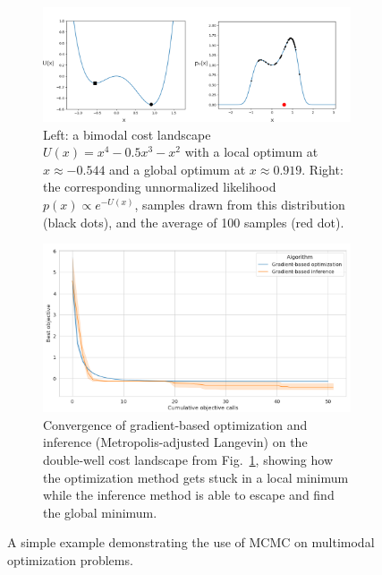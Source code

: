 \begin{figure}[tb]
    \centering
    \begin{subfigure}[b]{\linewidth}
        \centering
        \includegraphics[width=0.7\linewidth]{images/global_methods/sampling_as_optimization.png}
        \caption{Left: a bimodal cost landscape $U(x) = x^4 - 0.5 x^3 - x^2$ with a local optimum at $x\approx -0.544$ and a global optimum at $x\approx 0.919$. Right: the corresponding unnormalized likelihood $p(x) \propto e^{-U(x)}$, samples drawn from this distribution (black dots), and the average of 100 samples (red dot).}
        \label{ch:corl:fig:toy_example}
    \end{subfigure}
    \begin{subfigure}[b]{\linewidth}
        \centering
        \includegraphics[width=0.7\linewidth]{images/global_methods/double_well_gd_mala.png}
        \caption{Convergence of gradient-based optimization and inference (Metropolis-adjusted Langevin) on the double-well cost landscape from Fig.~\ref{ch:corl:fig:toy_example}, showing how the optimization method gets stuck in a local minimum while the inference method is able to escape and find the global minimum.}
        \label{ch:corl:fig:toy_example_convergence}
    \end{subfigure}
    \caption{A simple example demonstrating the use of MCMC on multimodal optimization problems.}
\end{figure}

